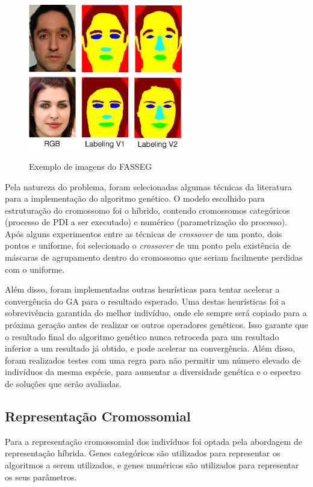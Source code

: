 \documentclass[12pt,oneside,a4paper,english,french,spanish,brazil,]{abntex2}
\begin{document}
\begin{figure}[ht]
\centering
\caption{Exemplo de imagens do FASSEG}
\includegraphics[width=0.6\textwidth]{imagens/FASSEG.png}
\label{fig:FASSEG}
\end{figure}

Pela natureza do problema, foram selecionadas algumas técnicas da literatura para a implementação do algoritmo genético. O modelo escolhido para estruturação do cromossomo foi o híbrido, contendo cromossomos categóricos (processo de PDI a ser executado) e numérico (parametrização do processo). Após alguns experimentos entre as técnicas de \textit{crossover} de um ponto, dois pontos e uniforme, foi selecionado o \textit{crossover} de um ponto pela existência de máscaras de agrupamento dentro do cromossomo que seriam facilmente perdidas com o uniforme.

Além disso, foram implementadas outras heurísticas para tentar acelerar a convergência do GA para o resultado esperado. Uma destas heurísticas foi a sobrevivência garantida do melhor indivíduo, onde ele sempre será copiado para a próxima geração antes de realizar os outros operadores genéticos. Isso garante que o resultado final do algoritmo genético nunca retroceda para um resultado inferior a um resultado já obtido, e pode acelerar na convergência. Além disso, foram realizados testes com uma regra para não permitir um número elevado de indivíduos da mesma espécie, para aumentar a diversidade genética e o espectro de soluções que serão avaliadas.

\subsection{Representação Cromossomial}

Para a representação cromossomial dos indivíduos foi optada pela abordagem de representação híbrida. Genes categóricos são utilizados para representar os algoritmos a serem utilizados, e genes numéricos são utilizados para representar os seus parâmetros.
\end{document}
